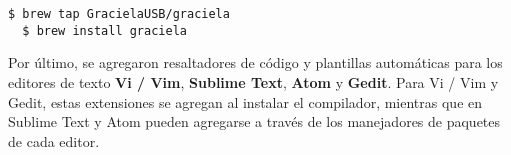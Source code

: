 \newpage

\begin{lstlisting}[caption=Instalación de Graciela en macOS con Homebrew, label={lst:brew}]
  $ brew tap GracielaUSB/graciela
  $ brew install graciela
\end{lstlisting}

Por último, se agregaron resaltadores de código y plantillas automáticas para
los editores de texto \textbf{Vi / Vim}, \textbf{Sublime Text}, \textbf{Atom} y
\textbf{Gedit}. Para Vi / Vim y Gedit, estas extensiones se agregan al instalar
el compilador, mientras que en Sublime Text y Atom pueden agregarse a través de
los manejadores de paquetes de cada editor.

